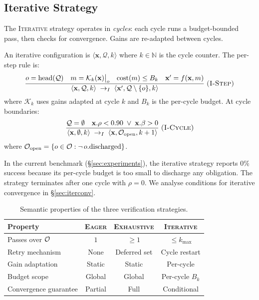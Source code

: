 \documentclass[11pt]{article}
\newcommand{\CL}{\mathcal{K}}              %
\newcommand{\xstate}{\mathbf{x}}           %
\newcommand{\vcov}{\rho}                   %
\newcommand{\obcount}{\beta}              %
\newcommand{\NatNum}{\mathbb{N}}
\begin{document}
\subsection{Iterative Strategy}

The \textsc{Iterative} strategy operates in \emph{cycles}: each cycle
runs a budget-bounded pass, then checks for convergence.  Gains are
re-adapted between cycles.

\begin{definition}
  \label{def:iterative}
  An iterative configuration is
  $\langle \xstate, \mathcal{Q}, k \rangle$ where $k \in \NatNum$ is
  the cycle counter.  The per-step rule is:
  \[
    \frac{
      o = \mathrm{head}(\mathcal{Q}) \quad
      m = \CL_k(\xstate)\big|_o \quad
      \mathrm{cost}(m) \leq B_k \quad
      \xstate' = f(\xstate, m)
    }{
      \langle \xstate, \mathcal{Q}, k \rangle
        \;\to_I\;
      \langle \xstate', \mathcal{Q} \setminus \{o\}, k \rangle
    }
    \;\textsc{(I-Step)}
  \]
  where $\CL_k$ uses gains adapted at cycle $k$ and $B_k$ is the
  per-cycle budget.  At cycle boundaries:
  \[
    \frac{
      \mathcal{Q} = \emptyset \quad
      \xstate.\vcov < 0.90 \;\lor\; \xstate.\obcount > 0
    }{
      \langle \xstate, \emptyset, k \rangle
        \;\to_I\;
      \langle \xstate, \oblig_{\mathrm{open}}, k+1 \rangle
    }
    \;\textsc{(I-Cycle)}
  \]
  where
  $\mathcal{O}_{\mathrm{open}} =
    \{o \in \mathcal{O} : \neg\, o.\mathrm{discharged}\}$.
\end{definition}

\begin{remark}
  In the current benchmark (\S\ref{sec:experiments}), the iterative
  strategy reports $0\%$ success because its per-cycle budget is too
  small to discharge any obligation.  The strategy terminates after one
  cycle with $\vcov = 0$.  We analyse conditions for iterative
  convergence in \S\ref{sec:iterconv}.
\end{remark}

\begin{table}[H]
  \centering
  \caption{Semantic properties of the three verification strategies.}
  \label{tab:strat_comparison}
  \begin{tabular}{lccc}
    \toprule
    Property & \textsc{Eager} & \textsc{Exhaustive} & \textsc{Iterative} \\
    \midrule
    Passes over $\mathcal{O}$    & $1$      & $\geq 1$   & $\leq k_{\max}$ \\
    Retry mechanism          & None     & Deferred set & Cycle restart \\
    Gain adaptation          & Static   & Static      & Per-cycle \\
    Budget scope             & Global   & Global      & Per-cycle $B_k$ \\
    Convergence guarantee    & Partial  & Full        & Conditional \\
    \bottomrule
  \end{tabular}
\end{table}
\end{document}
